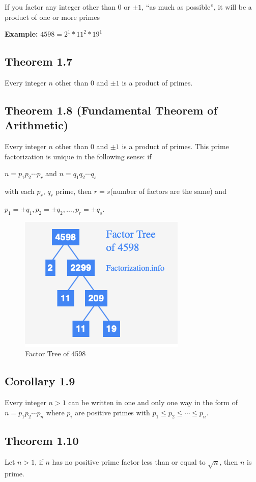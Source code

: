 \documentclass{article}
\begin{document}
If you factor any integer other than $0$ or $\pm1$, ``as much as possible'', it will be a product of one or more primes

\textbf{Example:} $4598 = 2^1 * 11^2 * 19^1$

\subsection*{Theorem 1.7}
Every integer $n$ other than $0$ and $\pm 1$ is a product of primes.

\subsection*{Theorem 1.8 (Fundamental Theorem of Arithmetic)}
Every integer $n$ other than $0$ and $\pm 1$ is a product of primes. This prime factorization is
unique in the following sense: if
\begin{center}
    $n = p_1p_2\cdots p_r$ and $n = q_1q_2\cdots q_s$
\end{center}
with each $p_r$, $q_r$ prime, then $r = s$(number of factors are the same) and
\begin{center}
    $p_1 = \pm q_1, p_2 = \pm q_2, \ldots, p_r = \pm q_s$.
\end{center}
\begin{figure}[h]
    \centering
    \includegraphics[scale=0.7]{factor-tree-of-4598.png}
    \caption{Factor Tree of 4598}\label{fig:Factor Tree of 4598}
\end{figure}

\subsection*{Corollary 1.9}
Every integer $n > 1$ can be written in one and only one way in the form of 
$n = p_1p_2\cdots p_n$ where $p_i$ are positive primes with 
$p_1 \leq p_2 \leq \cdots \leq p_n$.

\subsection*{Theorem 1.10}
Let $n > 1$, if $n$ has no positive prime factor less than or equal to $\sqrt{n}$,
then $n$ is prime.
\end{document}

